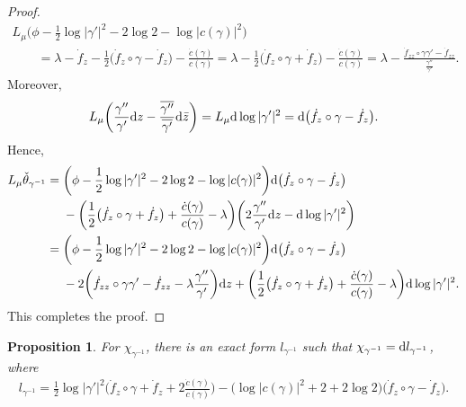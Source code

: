\documentclass[10pt,a4paper]{amsart}
\numberwithin{equation}{section}
\newtheorem{Proposition}[Theorem]{Proposition}
 { \theoremstyle{definition}
\newtheorem{Remark}[Theorem]{Remark} }
\begin{document}
\begin{proof}
\begin{gather*}
L_{\mu}\bigg(\phi-\frac{1}{2}\log|\gamma'|^2-2\log2-\log|c(\gamma)|^2\bigg)
\\ \qquad
{}=\lambda -\dot{f}_z-\frac{1}{2}\big(\dot{f}_z\circ\gamma-\dot{f}_z\big)
-\frac{\dot{c}(\gamma)}{c(\gamma)}
=\lambda -\frac{1}{2}\big(\dot{f}_z\circ\gamma+\dot{f}_z\big)-\frac{\dot{c}(\gamma)}{c(\gamma)}
=\lambda-\frac{\dot{f}_{zz}\circ\gamma\gamma'\!-\dot{f}_{zz}}{\frac{\gamma''}{\gamma'}}.
\end{gather*}
Moreover,
\begin{gather*}
L_{\mu}\bigg(\frac{\gamma''}{\gamma'}{\rm d}z-\frac{\overline{\gamma''}}{\overline{\gamma'}}{\rm d}\bar{z}\bigg)=L_{\mu}{\rm d}\log|\gamma'|^2={\rm d}\big(\dot{f}_z\circ\gamma-\dot{f}_z\big).
\end{gather*}
Hence,
\begin{align*}
L_{\mu}\check{\theta}_{\gamma^{-1}}
={}&\bigg(\phi-\frac{1}{2}\log|\gamma'|^2-2\log2-\log|c(\gamma)|^2\bigg)
{\rm d}\big(\dot{f}_z\circ\gamma-\dot{f}_z\big)
\\
&-\bigg( \frac{1}{2}\big(\dot{f}_z\circ\gamma+\dot{f}_z\big)
+\frac{\dot{c}(\gamma)}{c(\gamma)}-\lambda \bigg)\bigg(2\frac{\gamma''}{\gamma'}{\rm d}z-{\rm d}\log|\gamma'|^2\bigg)
\\
={}&\bigg(\phi-\frac{1}{2}\log|\gamma'|^2-2\log2-\log|c(\gamma)|^2\bigg)
{\rm d}\big(\dot{f}_z\circ\gamma-\dot{f}_z\big)
\\
&-2\bigg(\dot{f}_{zz}\circ\gamma\gamma'-\dot{f}_{zz}-\lambda\frac{\gamma''}{\gamma'} \bigg){\rm d}z
+\bigg( \frac{1}{2}\big(\dot{f}_z\circ\gamma+\dot{f}_z\big)
+\frac{\dot{c}(\gamma)}{c(\gamma)}-\lambda \bigg){\rm d}\log|\gamma'|^2.
\end{align*}
This completes the proof.
\end{proof}

\begin{Proposition}\label{p:exact-l} For $\chi_{\gamma^{-1}}$, there is an exact form $l_{\gamma^{-1}}$ such that $\chi_{\gamma^{-1}}={\rm d}l_{\gamma^{-1}}$, where
\begin{gather*}
l_{\gamma^{-1}}=\frac{1}{2}\log|\gamma'|^2\bigg(\dot{f}_z\circ\gamma +\dot{f}_z+2\frac{\dot{c}(\gamma)}{c(\gamma)}\bigg)
-\big(\log|c(\gamma)|^2+2+2\log 2\big)\big(\dot{f}_z\circ\gamma-\dot{f}_z\big).
\end{gather*}
\end{Proposition}
\end{document}
